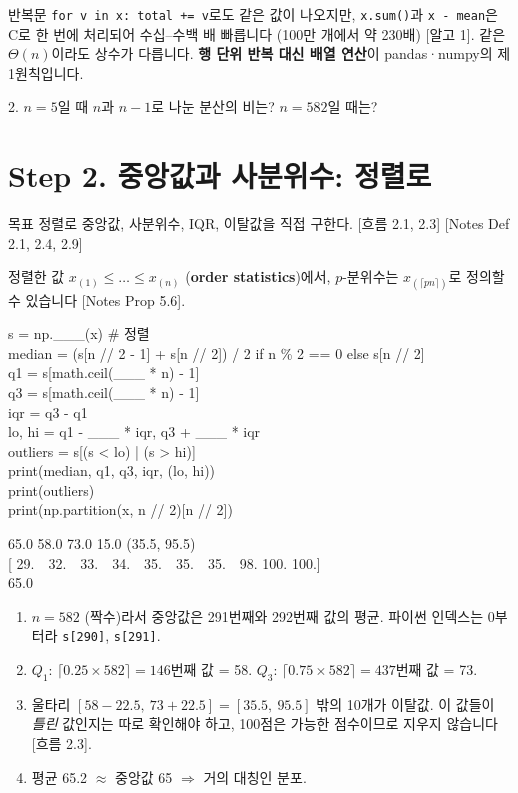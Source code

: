\documentclass[11pt,a4paper]{article}
\newcommand{\term}[1]{\textbf{#1}}
\newcommand{\code}[1]{\texttt{#1}}
\newcommand{\Wc}[1]{{\scriptsize\textsf{\color{blue!60!black}[흐름 #1]}}}
\newcommand{\Ac}[1]{{\scriptsize\textsf{\color{green!45!black}[알고 #1]}}}
\newcommand{\Nc}[1]{{\scriptsize\textsf{\color{violet!70!black}[Notes #1]}}}
\begin{document}
\begin{algobox}
반복문 \code{for v in x: total += v}로도 같은 값이 나오지만, \code{x.sum()}과 \code{x - mean}은 C로 한 번에 처리되어 수십–수백 배 빠릅니다 (100만 개에서 약 230배) \Ac{1}. 같은 $\Theta(n)$이라도 상수가 다릅니다. \textbf{행 단위 반복 대신 배열 연산}이 pandas·numpy의 제1원칙입니다.
\end{algobox}

\begin{qbox}
2. $n=5$일 때 $n$과 $n-1$로 나눈 분산의 비는? $n=582$일 때는?
\end{qbox}

\section{Step 2. 중앙값과 사분위수: 정렬로}
\begin{goalbox}{목표}
정렬로 중앙값, 사분위수, IQR, 이탈값을 직접 구한다. \Wc{2.1, 2.3} \Nc{Def 2.1, 2.4, 2.9}
\end{goalbox}

정렬한 값 $x_{(1)}\le\dots\le x_{(n)}$ (\term{order statistics})에서, $p$-분위수는 $x_{(\lceil pn\rceil)}$로 정의할 수 있습니다 \Nc{Prop 5.6}.

\begin{codebox}
s = np.\_\_\_(x) \hfill \# 정렬\\
median = (s[n // 2 - 1] + s[n // 2]) / 2 if n \% 2 == 0 else s[n // 2]\\
q1 = s[math.ceil(\_\_\_ * n) - 1]\\
q3 = s[math.ceil(\_\_\_ * n) - 1]\\
iqr = q3 - q1\\
lo, hi = q1 - \_\_\_ * iqr, q3 + \_\_\_ * iqr\\
outliers = s[(s < lo) | (s > hi)]\\
print(median, q1, q3, iqr, (lo, hi))\\
print(outliers)\\
print(np.partition(x, n // 2)[n // 2])
\end{codebox}
\begin{outbox}
65.0 58.0 73.0 15.0 (35.5, 95.5)\\
{}[ 29.\ \ 32.\ \ 33.\ \ 34.\ \ 35.\ \ 35.\ \ 35.\ \ 98. 100. 100.]\\
65.0
\end{outbox}

\begin{howbox}
\begin{enumerate}
\item $n=582$ (짝수)라서 중앙값은 291번째와 292번째 값의 평균. 파이썬 인덱스는 0부터라 \code{s[290]}, \code{s[291]}.
\item $Q_1$: $\lceil0.25\times582\rceil=146$번째 값 = 58. $Q_3$: $\lceil0.75\times582\rceil=437$번째 값 = 73.
\item 울타리 $[58-22.5,\ 73+22.5]=[35.5,\ 95.5]$ 밖의 10개가 이탈값. 이 값들이 \emph{틀린} 값인지는 따로 확인해야 하고, 100점은 가능한 점수이므로 지우지 않습니다 \Wc{2.3}.
\item 평균 65.2 $\approx$ 중앙값 65 $\Rightarrow$ 거의 대칭인 분포.
\end{enumerate}
\end{howbox}
\end{document}

